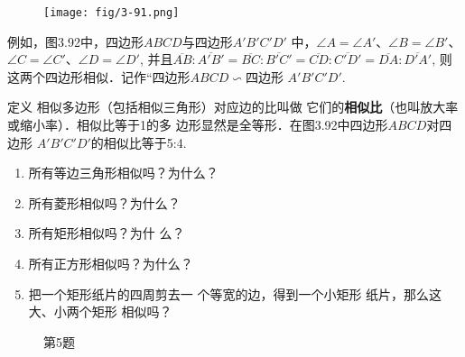 \begin{figure}[htp]
    \centering
\texttt{[image: fig/3-91.png]}
    \caption{}
\end{figure}

\begin{figure}[htp]
    \centering
    \caption{}
\end{figure}

例如，图3.92中，四边形$ABCD$与四边形$A'B'C'D'$
中，$\angle A=\angle A'$、$\angle B=\angle B'$、$\angle C=\angle C'$、$\angle D=\angle D'$, 
并且$\overline{AB}:\overline{A'B'}=\overline{BC}:\overline{B'C'}=\overline{CD}:\overline{C'D'}=\overline{DA}:\overline{D'A'}$, 则
这两个四边形相似．记作“四边形$ABCD\backsim$四边形
$A'B'C'D'$. 

\begin{blk}
    {定义} 相似多边形（包括相似三角形）对应边的比叫做
它们的\textbf{相似比}（也叫放大率或缩小率）．相似比等于1的多
边形显然是全等形．在图3.92中四边形$ABCD$对四边形
$A'B'C'D'$的相似比等于5:4.
\end{blk}

\begin{ex}
\begin{enumerate}
    \item 所有等边三角形相似吗？为什么？
    \item 所有菱形相似吗？为什么？
    \item 所有矩形相似吗？为什
    么？
    \item 所有正方形相似吗？为什么？
    \item 把一个矩形纸片的四周剪去一
    个等宽的边，得到一个小矩形
    纸片，那么这大、小两个矩形
    相似吗？
\end{enumerate}
\end{ex}

\begin{figure}[htp]
    \centering
{}
    \caption*{第5题}
\end{figure}

